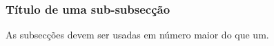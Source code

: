 \documentclass[journal, twoside, a4paper]{IEEEtran_LEEC_v1}
\begin{document}
\subsubsection{Título de uma sub-subsecção}
As subsecções devem ser usadas em número maior do que um.


%
%

\end{document}
